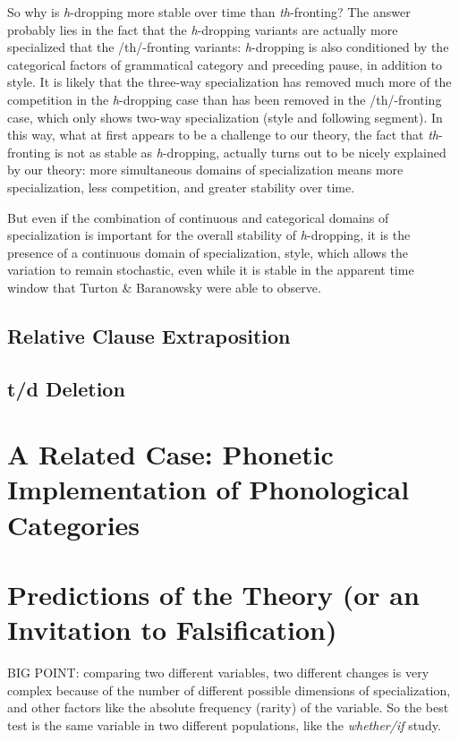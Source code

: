 So why is \textsl{h}-dropping more stable over time than \textsl{th}-fronting?
The answer probably lies in the fact that the \textsl{h}-dropping variants are actually more specialized that the /th/-fronting variants: \textsl{h}-dropping is also conditioned by the categorical factors of grammatical category and preceding pause, in addition to style.
It is likely that the three-way specialization has removed much more of the competition in the \textsl{h}-dropping case than has been removed in the /th/-fronting case, which only shows two-way specialization (style and following segment).
In this way, what at first appears to be a challenge to our theory, the fact that \textsl{th}-fronting is not as stable as \textsl{h}-dropping, actually turns out to be nicely explained by our theory: more simultaneous domains of specialization means more specialization, less competition, and greater stability over time.

But even if the combination of continuous and categorical domains of specialization is important for the overall stability of \textsl{h}-dropping, it is the presence of a continuous domain of specialization, style, which allows the variation to remain stochastic, even while it is stable in the apparent time window that Turton \& Baranowsky were able to observe.


\subsection{Relative Clause Extraposition}
\label{relclause}

\subsection{t/d Deletion}




\section{A Related Case: Phonetic Implementation of Phonological Categories}


\section{Predictions of the Theory (or an Invitation to Falsification)}
BIG POINT: comparing two different variables, two different changes is very complex because of the number of different possible dimensions of specialization, and other factors like the absolute frequency (rarity) of the variable.
So the best test is the same variable in two different populations, like the \textsl{whether/if} study.

